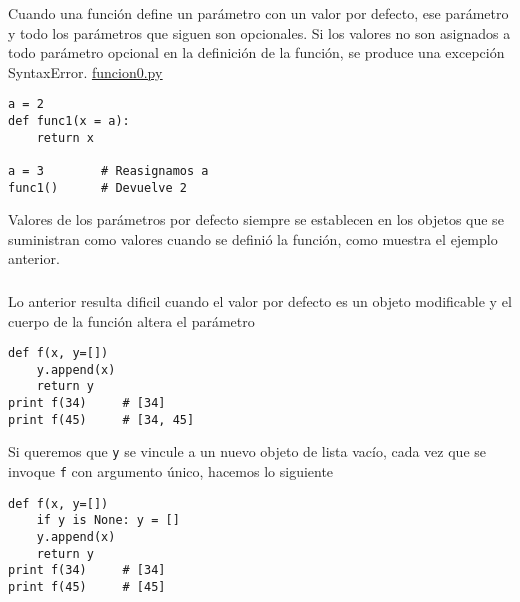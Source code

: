 \documentclass[10pt]{beamer}
\begin{document}
\begin{frame}[fragile]
\frametitle{}
Cuando una funci\'on  define un par\'ametro con un valor por defecto, ese par\'ametro y todo los
par\'ametros que siguen son opcionales. Si los valores no son  asignados a todo  par\'ametro opcional
en la definici\'on de la funci\'on, se produce una excepci\'on SyntaxError. \href{run:funcion0.py}{\underline{funcion0.py}}

\vspace{0.2cm}

\begin{lstlisting}
a = 2
def func1(x = a):
    return x
    
a = 3        # Reasignamos a
func1()      # Devuelve 2
\end{lstlisting}

\vspace{0.2cm}

Valores de los par\'ametros por defecto siempre se establecen en los objetos que se suministran como valores cuando se defini\'o la funci\'on, como muestra el ejemplo anterior.
\end{frame}

\begin{frame}[fragile]
\frametitle{}

Lo anterior resulta dificil cuando el valor por defecto es un objeto modificable y el cuerpo de la funci\'on altera el par\'ametro

\vspace{0.2cm}

\begin{lstlisting}
def f(x, y=[])
    y.append(x)
    return y
print f(34)     # [34]
print f(45)     # [34, 45]
\end{lstlisting}

\vspace{0.2cm}

Si queremos que \texttt{y} se vincule a un nuevo objeto de lista vac\'io, cada vez que se invoque \texttt{f} con argumento \'unico, hacemos lo siguiente

\vspace{0.2cm}

\begin{lstlisting}
def f(x, y=[])
    if y is None: y = []
    y.append(x)
    return y
print f(34)     # [34]
print f(45)     # [45]
\end{lstlisting}
\end{frame}
\end{document}
